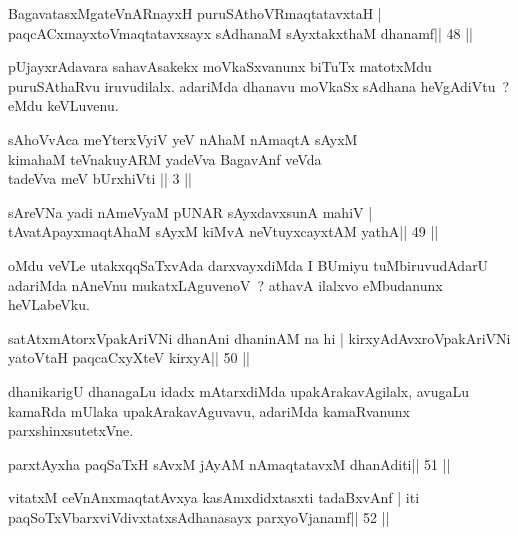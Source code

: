 \begin{shl}
BagavatasxMgateVnARnayxH puruSAthoVR\s maqtatavxtaH |
paqcACxmayxtoV\s maqtatavxsayx sAdhanaM sAyxtakxthaM dhanamf\hfill || 48 ||
\end{shl}

\begin{artha}
pUjayxrAdavara sahavAsakekx moVkaSxvanunx biTuTx matotxMdu puruSAthaRvu iruvudilalx. adariMda dhanavu moVkaSx sAdhana heVgAdiVtu~? eMdu keVLuvenu.
\end{artha}


\begin{shl}
sAhoVvAca meYterxVyiV yeV nAhaM nAmaqtA sAyxM\\
kimahaM teVnakuyARM yadeVva BagavAnf veVda\\
tadeVva meV bUrxhiVti || 3 ||
\end{shl}

\begin{shl}
sAreVNa yadi nAmeVyaM pUNAR sAyxdavxsunA mahiV |
tAvatA\s payxmaqtA\s haM sAyxM kiMvA neVtuyxcayxtAM yathA\hfill || 49 ||
\end{shl}

\begin{artha}
oMdu veVLe utakxqqSaTxvAda darxvayxdiMda I BUmiyu tuMbiruvudAdarU adariMda nAneVnu mukatxLAguvenoV~? athavA ilalxvo eMbudanunx heVLabeVku.
\end{artha}

\begin{shl}
satAtxmAtorxVpakAriVNi dhanAni dhaninAM na hi |
kirxyAdAvxroVpakAriVNi yatoV\s taH paqcaCxyXteV kirxyA\hfill || 50 ||
\end{shl}

\begin{artha}
dhanikarigU dhanagaLu idadx mAtarxdiMda upakArakavAgilalx, avugaLu
kamaRda mUlaka upakArakavAguvavu, adariMda kamaRvanunx
parxshinxsutetxVne.
\end{artha}


\begin{shl}
parxtAyxha paqSaTxH sAvxM jAyAM nAmaqtatavxM dhanAditi\hfill || 51 ||
\end{shl}

\begin{shl}
vitatxM ceVnAnxmaqtatAvxya kasAmxdidxtasxti tadaBxvAnf |
iti paqSoTxV\s barxviVdivxtatxsAdhanasayx parxyoVjanamf\hfill || 52 ||
\end{shl}

